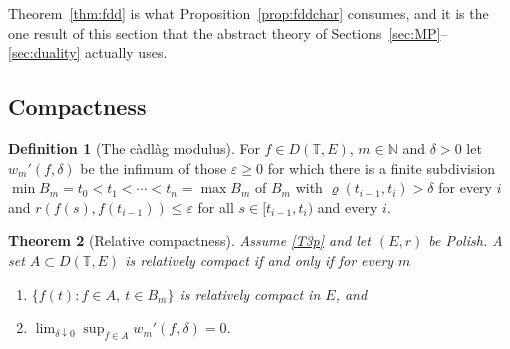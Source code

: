\documentclass[11pt,a4paper]{article}
\theoremstyle{plain}
\newtheorem{theorem}{Theorem}[section]
\theoremstyle{definition}
\newtheorem{definition}[theorem]{Definition}
\theoremstyle{remark}
\newcommand{\N}{\mathbb{N}}
\newcommand{\T}{\mathbb{T}}                     %
\newcommand{\DT}{D(\T,E)}
\begin{document}
Theorem~\ref{thm:fdd} is what Proposition~\ref{prop:fddchar} consumes, and it is
the one result of this section that the abstract theory of
Sections~\ref{sec:MP}--\ref{sec:duality} actually uses.

\subsection{Compactness}
\label{ssec:skorokhodcompact}

\begin{definition}[The c\`adl\`ag modulus]
  \label{def:modulus}
  For $f \in \DT$, $m \in \N$ and $\delta > 0$ let $w_m'(f,\delta)$ be the
  infimum of those $\varepsilon \geq 0$ for which there is a finite subdivision
  $\min B_m = t_0 < t_1 < \cdots < t_n = \max B_m$ of $B_m$ with
  $\varrho(t_{i-1}, t_i) > \delta$ for every $i$ and
  $r(f(s), f(t_{i-1})) \leq \varepsilon$ for all $s \in [t_{i-1}, t_i)$ and
  every $i$.
\end{definition}

\begin{theorem}[Relative compactness]
  \label{thm:DEcompact}
  Assume \eqref{T3p} and let $(E,r)$ be Polish.  A set $A \subset \DT$ is relatively
  compact if and only if for every $m$
  \begin{enumerate}[label=(\roman*), nosep]
  \item $\{f(t) : f \in A,\ t \in B_m\}$ is relatively compact in $E$, and
  \item $\lim_{\delta \downarrow 0} \sup_{f \in A} w_m'(f,\delta) = 0$.
  \end{enumerate}
\end{theorem}
\end{document}
